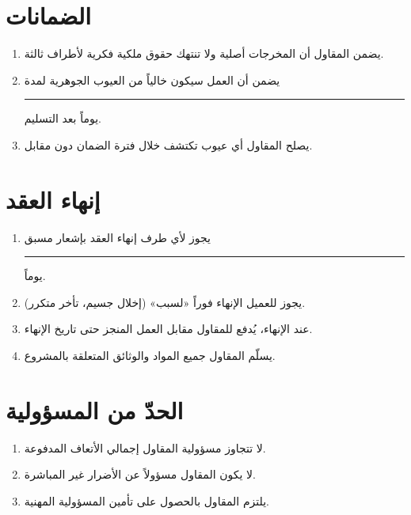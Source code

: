 \documentclass[12pt,a4paper]{article}
\begin{document}
\section{الضمانات}
\label{sec:warranties}
\begin{enumerate}
    \item يضمن المقاول أن المخرجات أصلية ولا تنتهك حقوق ملكية فكرية لأطراف ثالثة.
    \item يضمن أن العمل سيكون خالياً من العيوب الجوهرية لمدة \rule{2cm}{0.4pt} يوماً بعد التسليم.
    \item يصلح المقاول أي عيوب تكتشف خلال فترة الضمان دون مقابل.
\end{enumerate}

\section{إنهاء العقد}
\label{sec:termination}
\begin{enumerate}
    \item يجوز لأي طرف إنهاء العقد بإشعار مسبق \rule{2cm}{0.4pt} يوماً.
    \item يجوز للعميل الإنهاء فوراً «لسبب» (إخلال جسيم، تأخر متكرر).
    \item عند الإنهاء، يُدفع للمقاول مقابل العمل المنجز حتى تاريخ الإنهاء.
    \item يسلّم المقاول جميع المواد والوثائق المتعلقة بالمشروع.
\end{enumerate}

\section{الحدّ من المسؤولية}
\label{sec:liability}
\begin{enumerate}
    \item لا تتجاوز مسؤولية المقاول إجمالي الأتعاف المدفوعة.
    \item لا يكون المقاول مسؤولاً عن الأضرار غير المباشرة.
    \item يلتزم المقاول بالحصول على تأمين المسؤولية المهنية.
\end{enumerate}
\end{document}
